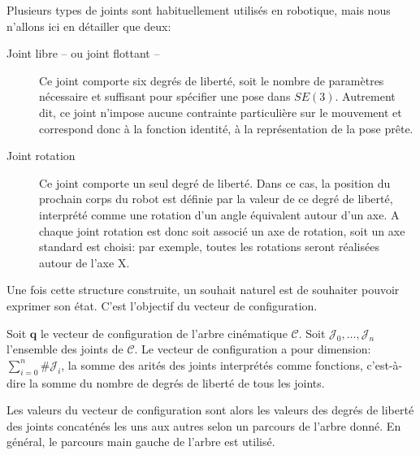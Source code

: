 Plusieurs types de joints sont habituellement utilisés en robotique,
mais nous n'allons ici en détailler que deux:
\begin{description}
\item[Joint libre -- ou joint flottant --] Ce joint
  comporte six degrés de liberté, soit le nombre de paramètres
  nécessaire et suffisant pour spécifier une pose dans
  $SE(3)$. Autrement dit, ce joint n'impose aucune contrainte
  particulière sur le mouvement et correspond donc à la fonction
  identité, à la représentation de la pose prête.
\item[Joint rotation] Ce joint comporte un seul
  degré de liberté. Dans ce cas, la position du prochain corps du
  robot est définie par la valeur de ce degré de liberté, interprété
  comme une rotation d'un angle équivalent autour d'un axe. A chaque
  joint rotation est donc soit associé un axe de rotation, soit un axe
  standard est choisi: par exemple, toutes les rotations seront
  réalisées autour de l'axe X.
\end{description}


Une fois cette structure construite, un souhait naturel est de
souhaiter pouvoir exprimer son état. C'est l'objectif du vecteur de
configuration.

\begin{mydef}
  Soit $\mathbf{q}$ le vecteur de configuration de l'arbre cinématique
  $\mathcal{C}$. Soit $\mathcal{J}_0, \dotsc, \mathcal{J}_n$
  l'ensemble des joints de $\mathcal{C}$. Le vecteur de configuration
  a pour dimension: $\sum_{i=0}^n \#\mathcal{J}_i$, la somme des arités
  des joints interprétés comme fonctions, c'est-à-dire la somme du
  nombre de degrés de liberté de tous les joints.


  Les valeurs du vecteur de configuration sont alors les valeurs des
  degrés de liberté des joints concaténés les uns aux autres selon un
  parcours de l'arbre donné. En général, le parcours main gauche de
  l'arbre est utilisé.
\end{mydef}

